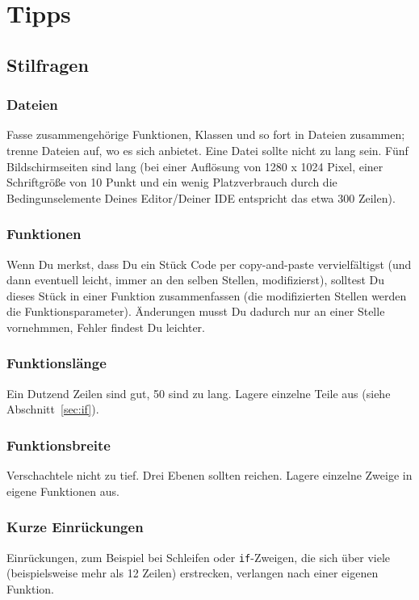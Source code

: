 \documentclass[twoside]{scrreprt}
\providecommand{\code}[1]{\texttt{#1}}
\begin{document}
\chapter{Tipps\label{sec:tipps}}
\section{Stilfragen}
\subsection{Dateien}
Fasse zusammengeh\"o{}rige Funktionen, Klassen und so fort in Dateien zusammen;
trenne Dateien auf, wo es sich anbietet.
Eine Datei sollte nicht zu lang sein. F\"u{}nf Bildschirmseiten sind
lang (bei einer Aufl\"o{}sung von 1280 x 1024 Pixel, einer
Schriftgr\"o{}\ss{}e von 10 Punkt und ein wenig Platzverbrauch durch die
Bedingunselemente Deines Editor/Deiner IDE entspricht das etwa 300
Zeilen).

\subsection{Funktionen}
Wenn Du merkst, dass Du ein St\"u{}ck Code per copy-and-paste
vervielf\"a{}ltigst
(und dann eventuell leicht, immer an den selben Stellen, modifizierst),
solltest Du dieses St\"u{}ck in einer Funktion zusammenfassen
(die modifizierten Stellen werden die Funktionsparameter).
\"A{}nderungen musst Du dadurch nur an einer Stelle vornehmmen, Fehler
findest Du leichter.

\subsection{Funktionsl\"a{}nge}
Ein Dutzend Zeilen sind gut, 50 sind zu lang.
Lagere einzelne Teile aus (siehe Abschnitt~\ref{sec:if}).

\subsection{Funktionsbreite\label{sec:breite}}
Verschachtele nicht zu tief. Drei Ebenen sollten reichen.
Lagere einzelne Zweige in eigene Funktionen aus.

\subsection{Kurze Einr\"u{}ckungen}
Einr\"u{}ckungen, zum Beispiel bei Schleifen oder \code{if}-Zweigen,
die sich \"u{}ber viele (beispielsweise mehr als 12 Zeilen) erstrecken,
verlangen nach einer eigenen Funktion.
\end{document}
